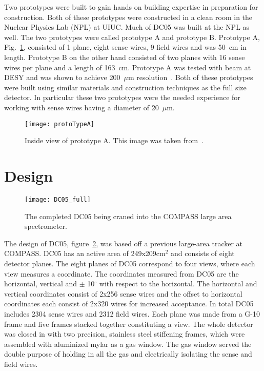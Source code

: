Two prototypes were built to gain hands on building expertise in preparation for
construction.  Both of these prototypes were constructed in a clean room in the
Nuclear Physics Lab (NPL) at UIUC.  Much of DC05 was built at the NPL as well.
The two prototypes were called prototype A and prototype B.  Prototype A,
Fig.~\ref{fig::protoTypeA}, consisted of 1 plane, eight sense wires, 9 field
wires and was 50~cm in length.  Prototype B on the other hand consisted of two
planes with 16 sense wires per plane and a length of 163~cm.  Prototype A was
tested with beam at DESY and was shown to achieve 200~$\mu$m
resolution~\cite{choi}.  Both of these prototypes were built using similar
materials and construction techniques as the full size detector.  In particular
these two prototypes were the needed experience for working with sense wires
having a diameter of 20~$\mu$m.

\begin{figure}[h!t]
  \centering \texttt{[image: protoTypeA]}
  \caption{Inside view of prototype A.  This image was taken from~\cite{choi}. }
  \label{fig::protoTypeA}
\end{figure}


\section{Design}

\begin{figure}
  \centering \texttt{[image: DC05\_full]}
  \caption{}{The completed DC05 being craned into the COMPASS large area
    spectrometer.}
  \label{fig:DC05}%
\end{figure}

The design of DC05, figure~\ref{fig:DC05}, was based off a previous large-area
tracker at COMPASS.  DC05 has an active area of 249x209cm$^2$ and consists of
eight detector planes.  The eight planes of DC05 correspond to four views, where
each view measures a coordinate.  The coordinates measured from DC05 are the
horizontal, vertical and $\pm$ 10$^{\circ}$ with respect to the horizontal.  The
horizontal and vertical coordinates consist of 2x256 sense wires and the offset
to horizontal coordinates each consist of 2x320 wires for increased acceptance.
In total DC05 includes 2304 sense wires and 2312 field wires.  Each plane was
made from a G-10 frame and five frames stacked together constituting a view.
The whole detector was closed in with two precision, stainless steel stiffening
frames, which were assembled with aluminized mylar as a gas window.  The gas
window served the double purpose of holding in all the gas and electrically
isolating the sense and field wires.

